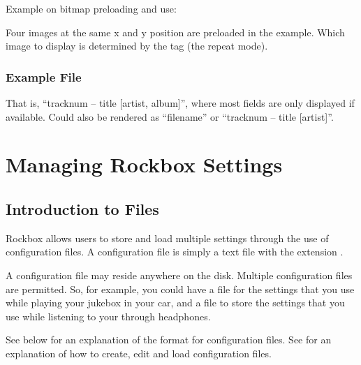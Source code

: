 Example on bitmap preloading and use:
\begin{example}
\end{example}
Four images at the same x and y position are preloaded in the example. Which 
image to display is determined by the  tag (the repeat mode).

\subsubsection{Example File}
\begin{example}
\end{example}
That is, ``tracknum -- title [artist, album]'', where most fields are only
displayed if available. Could also be rendered as ``filename'' or ``tracknum --
title [artist]''.

%  

\section{\label{ref:manage_settings}Managing Rockbox Settings}

\subsection{Introduction to  Files}
Rockbox allows users to store and load multiple settings through the use of
configuration files. A configuration file is simply a text file with the
extension .

A configuration file may reside anywhere on the disk. Multiple
configuration files are permitted. So, for example, you could have
a  file for the settings that you use while playing your
jukebox in your car, and a  file to store the
settings that you use while listening to your \dap{} through headphones.

See  below for an explanation of the format 
for configuration files. See  for an
explanation of how to create, edit and load configuration files.

